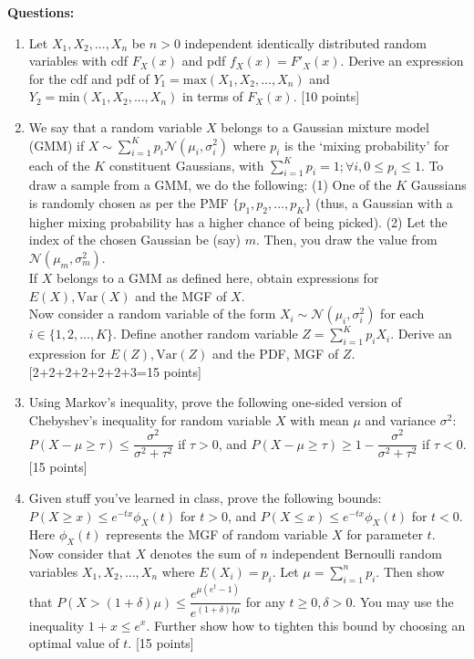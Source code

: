 \documentclass[11pt]{article}
\begin{document}
\textbf{Questions:}
\begin{enumerate}
\item Let $X_1, X_2, ..., X_n$ be $n > 0$ independent identically distributed random variables with cdf $F_X(x)$ and pdf $f_X(x) = F'_X(x)$. Derive an expression for the cdf and pdf of $Y_1 = \textrm{max}(X_1, X_2, ..., X_n)$ and $Y_2 = \textrm{min}(X_1, X_2, ..., X_n)$ in terms of $F_X(x)$. \textsf{[10 points]}

\item We say that a random variable $X$ belongs to a Gaussian mixture model (GMM) if $X \sim \sum_{i=1}^K p_i \mathcal{N}(\mu_i,\sigma^2_i)$ where $p_i$ is the `mixing probability' for each of the $K$ constituent Gaussians, with $\sum_{i=1}^K p_i = 1; \forall i, 0 \leq p_i \leq 1$. To draw a sample from a GMM, we do the following: (1) One of the $K$ Gaussians is randomly chosen as per the PMF $\{p_1,p_2,...,p_K\}$ (thus, a Gaussian with a higher mixing probability has a higher chance of being picked). (2) Let the index of the chosen Gaussian be (say) $m$. Then, you draw the value from $\mathcal{N}(\mu_m,\sigma^2_m)$.  \\
If $X$ belongs to a GMM as defined here, obtain expressions for $E(X), \textrm{Var}(X)$ and the MGF of $X$. \\
Now consider a random variable of the form $X_i \sim \mathcal{N}(\mu_i,\sigma^2_i)$ for each $i \in \{1,2,...,K\}$. Define another random variable $Z = \sum_{i=1}^K p_i X_i$. Derive an expression for $E(Z), \textrm{Var}(Z)$ and the PDF, MGF of $Z$. \textsf{[2+2+2+2+2+2+3=15 points]} 

\item Using Markov's inequality, prove the following one-sided version of Chebyshev's inequality for random variable $X$ with mean $\mu$ and variance $\sigma^2$:
$P(X-\mu \geq \tau) \leq \dfrac{\sigma^2}{\sigma^2 + \tau^2}$ if $\tau > 0$, and $P(X-\mu \geq \tau) \geq 1-\dfrac{\sigma^2}{\sigma^2 + \tau^2}$ if $\tau < 0$. \textsf{[15 points]}

\item Given stuff you've learned in class, prove the following bounds: $P(X \geq x) \leq e^{-tx} \phi_X(t)$ for $t > 0$, and $P(X \leq x) \leq e^{-tx} \phi_X(t)$ for $t < 0$. Here $\phi_X(t)$ represents the MGF of random variable $X$ for parameter $t$. \\
Now consider that $X$ denotes the sum of $n$ independent Bernoulli random variables $X_1, X_2,...,X_n$ where $E(X_i) = p_i$. Let $\mu = \sum_{i=1}^n p_i$. Then show that $P(X > (1+\delta)\mu) \leq \dfrac{e^{\mu(e^t-1)}}{e^{(1+\delta)t\mu}}$ for any $t \geq 0, \delta > 0$. You may use the inequality $1+x \leq e^x$. Further show how to tighten this bound by choosing an optimal value of $t$.
\textsf{[15 points]}


\end{enumerate}
\end{document}
